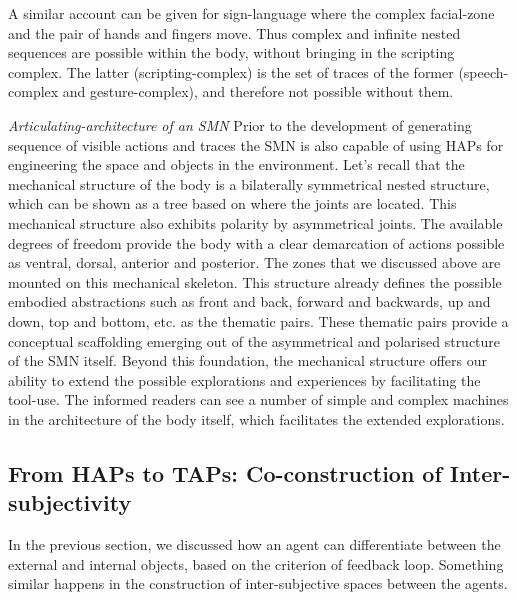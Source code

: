 A similar account can be given for sign-language where the complex facial-zone and the pair of hands and fingers move. Thus complex and infinite nested sequences are possible within the body, without bringing in the scripting complex. The latter (scripting-complex) is the set of traces of the former (speech-complex and gesture-complex), and therefore not possible without them. 
 

\emph{Articulating-architecture of an SMN} Prior to the development of generating sequence of visible actions and traces the SMN is also capable of using HAPs for engineering the space and objects in the environment. Let's recall that the mechanical structure of the body is a bilaterally symmetrical nested structure, which can be shown as a tree based on where the joints are located. This mechanical structure also exhibits polarity by asymmetrical joints. The available degrees of freedom provide the body with a clear demarcation of actions possible as ventral, dorsal, anterior and posterior. The zones that we discussed above are mounted on this mechanical skeleton. This structure already defines the possible embodied abstractions such as front and back, forward and backwards, up and down, top and bottom, etc. as the thematic pairs. These thematic pairs provide a conceptual scaffolding emerging out of the asymmetrical and polarised structure of the SMN itself. Beyond this foundation, the mechanical structure offers our ability to extend the possible explorations and experiences by facilitating the tool-use. The informed readers can see a number of simple and complex machines in the architecture of the body itself, which facilitates the extended explorations. 

\subsection{From HAPs to TAPs: Co-construction of Inter-subjectivity}
In the previous section, we discussed how an agent can differentiate between the external and internal objects, based on the criterion of feedback loop. Something similar happens in the construction of inter-subjective spaces between the agents. 

